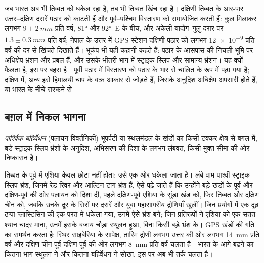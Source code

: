 जब भारत अब भी तिब्बत को धकेल रहा है, तब भी तिब्बत खिंच रहा है। दक्षिणी तिब्बत के आर-पार उत्तर--दक्षिण
दरारें पठार को काटती हैं और पूर्व--पश्चिम विस्तारण को समायोजित करती हैं: कुल मिलाकर लगभग $9 \pm \qty{2}{mm}$ प्रति वर्ष,
\ang{81} और \ang{92}~E के बीच, और अकेली यादोंग--गुलु दरार पर $1.3 \pm \qty{0.3}{mm}$ प्रति वर्ष;
नेपाल के उत्तर में GPS स्टेशन दक्षिणी पठार को लगभग
\num{12e-9} प्रति वर्ष की दर से खिंचते दिखाते हैं। भूकंप भी यही कहानी कहते हैं: पठार के आसपास की निचली भूमि पर
अधिक्षेप-भ्रंशन और  प्रबल हैं, और उसके भीतरी भाग में स्ट्राइक-स्लिप और सामान्य भ्रंशन।
यह क्यों फैलता है, इस पर बहस है। पूर्वी पठार में विस्तारण को पठार के भार से चालित  के रूप में पढ़ा गया है; दक्षिण में, अन्य इसे हिमालयी चाप के वक्र आकार से जोड़ते हैं,
जिसके अनुदिश अधिक्षेप अपसारी होते हैं, या भारत के नीचे सरकने से।

\subsection{बग़ल में निकल भागना}

\begin{definition}[पार्श्विक बहिर्वेधन]\label{def:b2:himalaya-andes:extrusion}
\emph{पार्श्विक बहिर्वेधन} (पलायन विवर्तनिकी) भूपर्पटी या स्थलमंडल के खंडों का
किसी टक्कर-क्षेत्र से बग़ल में, बड़े स्ट्राइक-स्लिप भ्रंशों के अनुदिश,
अभिसरण की दिशा के लगभग लंबवत, किसी मुक्त सीमा की ओर निष्कासन है।
\end{definition}

तिब्बत के पूर्व में एशिया केवल छोटा नहीं होता; उसे एक ओर धकेला जाता है। लंबे वाम-पार्श्वी स्ट्राइक-स्लिप
भ्रंश, जिनमें रेड रिवर और आल्टिन टाग भ्रंश हैं, ऐसे पढ़े जाते हैं कि उन्होंने बड़े खंडों के
पूर्व और दक्षिण-पूर्व की ओर पलायन को दिशा दी, पहले दक्षिण-पूर्व एशिया के सुंडा खंड को,
फिर तिब्बत और दक्षिण चीन को, जबकि उनके दूर के सिरों पर दरारें और युवा महासागरीय द्रोणियाँ खुलीं।
जिन प्रयोगों में एक दृढ़ ठप्पा प्लास्टिसिन की एक परत में धकेला गया, उनमें ऐसे भ्रंश बने;
जिन प्रतिरूपों ने एशिया को एक सतत श्यान चादर माना, उनमें इसके बजाय चौड़ा स्थूलन हुआ,
बिना किसी बड़े भ्रंश के। GPS खंडों की गति का समर्थन करता है: स्थिर साइबेरिया के सापेक्ष, तारिम
द्रोणी लगभग उत्तर की ओर लगभग \qty{14}{mm} प्रति वर्ष और दक्षिण चीन पूर्व-दक्षिण-पूर्व की ओर
लगभग \qty{8}{mm} प्रति वर्ष चलता है। भारत के आगे बढ़ने का कितना भाग स्थूलन ने और कितना
बहिर्वेधन ने सोखा, इस पर अब भी तर्क चलता है।

